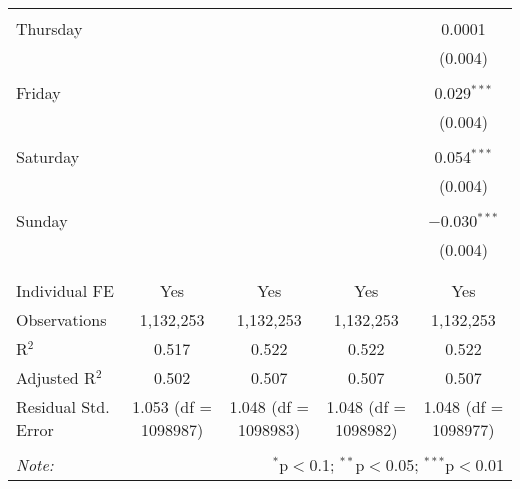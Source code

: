\documentclass[
]{article}
\begin{document}
\begin{table}[!htbp]
{\begin{tabular}{@{\extracolsep{5pt}}lcccc}
  & & & & \\ 
 Thursday &  &  &  & 0.0001 \\ 
  &  &  &  & (0.004) \\ 
  & & & & \\ 
 Friday &  &  &  & 0.029$^{***}$ \\ 
  &  &  &  & (0.004) \\ 
  & & & & \\ 
 Saturday &  &  &  & 0.054$^{***}$ \\ 
  &  &  &  & (0.004) \\ 
  & & & & \\ 
 Sunday &  &  &  & $-$0.030$^{***}$ \\ 
  &  &  &  & (0.004) \\ 
  & & & & \\ 
\hline \\[-1.8ex] 
Individual FE & Yes & Yes & Yes & Yes \\ 
Observations & 1,132,253 & 1,132,253 & 1,132,253 & 1,132,253 \\ 
R$^{2}$ & 0.517 & 0.522 & 0.522 & 0.522 \\ 
Adjusted R$^{2}$ & 0.502 & 0.507 & 0.507 & 0.507 \\ 
Residual Std. Error & 1.053 (df = 1098987) & 1.048 (df = 1098983) & 1.048 (df = 1098982) & 1.048 (df = 1098977) \\ 
\hline 
\hline \\[-1.8ex] 
\textit{Note:}  & \multicolumn{4}{r}{$^{*}$p$<$0.1; $^{**}$p$<$0.05; $^{***}$p$<$0.01} \\ 
\end{tabular}
} 
\end{table} 
\newpage
\end{document}
